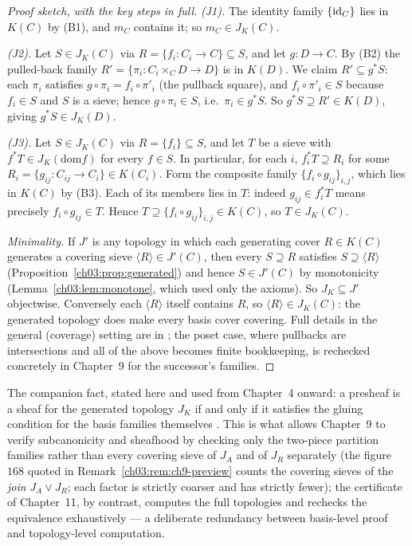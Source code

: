 \begin{proof}[Proof sketch, with the key steps in full]
\emph{(J1).} The identity family $\{\mathrm{id}_C\}$ lies in $K(C)$ by
(B1), and $m_C$ contains it; so $m_C \in J_K(C)$.

\emph{(J2).} Let $S \in J_K(C)$ via $R = \{f_i : C_i \to C\}
\subseteq S$, and let $g : D \to C$. By (B2) the pulled-back family
$R' = \{\pi_i : C_i \times_C D \to D\}$ is in $K(D)$. We claim
$R' \subseteq g^* S$: each $\pi_i$ satisfies
$g \circ \pi_i = f_i \circ \pi'_i$ (the pullback square), and
$f_i \circ \pi'_i \in S$ because $f_i \in S$ and $S$ is a sieve;
hence $g \circ \pi_i \in S$, i.e.\ $\pi_i \in g^* S$. So
$g^* S \supseteq R' \in K(D)$, giving $g^* S \in J_K(D)$.

\emph{(J3).} Let $S \in J_K(C)$ via $R = \{f_i\} \subseteq S$, and
let $T$ be a sieve with $f^* T \in J_K(\mathrm{dom} f)$ for every
$f \in S$. In particular, for each $i$, $f_i^* T \supseteq R_i$
for some $R_i = \{g_{ij} : C_{ij} \to C_i\} \in K(C_i)$. Form the
composite family $\{f_i \circ g_{ij}\}_{i,j}$, which lies in
$K(C)$ by (B3). Each of its members lies in $T$: indeed
$g_{ij} \in f_i^* T$ means precisely $f_i \circ g_{ij} \in T$.
Hence $T \supseteq \{f_i \circ g_{ij}\}_{i,j} \in K(C)$, so
$T \in J_K(C)$.

\emph{Minimality.} If $J'$ is any topology in which each generating
cover $R \in K(C)$ generates a covering sieve
$\langle R \rangle \in J'(C)$, then every $S \supseteq R$ satisfies
$S \supseteq \langle R \rangle$ (Proposition~\ref{ch03:prop:generated})
and hence $S \in J'(C)$ by monotonicity
(Lemma~\ref{ch03:lem:monotone}, which used only the axioms). So
$J_K \subseteq J'$ objectwise. Conversely each
$\langle R \rangle$ itself contains $R$, so
$\langle R \rangle \in J_K(C)$: the generated topology does make
every basis cover covering. Full details in the general (coverage)
setting are in \cite{stacks00ZC}; the poset case, where pullbacks
are intersections and all of the above becomes finite bookkeeping,
is rechecked concretely in Chapter~9 for the successor's families.
\end{proof}

\begin{remark}\label{ch03:rem:basis-sheaf}
The companion fact, stated here and used from Chapter~4 onward: a
presheaf is a sheaf for the generated topology $J_K$ if and only if
it satisfies the gluing condition for the basis families themselves
\cite{stacks00ZC,maclane}. This is what allows Chapter~9 to verify
subcanonicity and sheafhood by checking only the two-piece
partition families rather than every covering sieve of $J_A$ and of
$J_R$ separately (the figure $168$ quoted in
Remark~\ref{ch03:rem:ch9-preview} counts the covering sieves of the
\emph{join} $J_A \vee J_R$; each factor is strictly coarser and has
strictly fewer); the
certificate of Chapter~11, by contrast, computes the full
topologies and rechecks the equivalence exhaustively --- a
deliberate redundancy between basis-level proof and
topology-level computation.
\end{remark}

